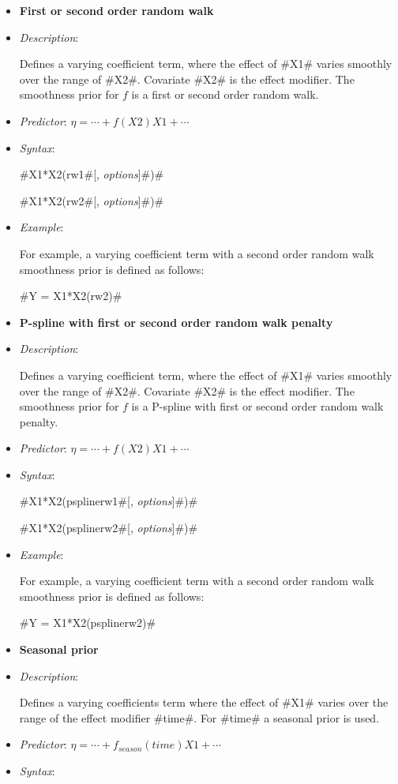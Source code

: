 \begin{itemize}
\item[]{\bf\sffamily First or second order random walk}

\item[] {\em Description}:

Defines a varying coefficient term, where the effect of #X1# varies
smoothly over the range of #X2#. Covariate #X2# is the effect
modifier. The smoothness prior for $f$ is a first or second order
random walk.
\item[] {\em Predictor}: $\eta= \cdots + f(X2)X1 + \cdots$
\item[] {\em Syntax}:

#X1*X2(rw1#[, {\em options}]#)#

#X1*X2(rw2#[, {\em options}]#)#
\item[] {\em Example}:

For example, a varying coefficient term with a second order random
walk smoothness prior is defined as follows:

#Y = X1*X2(rw2)#

\item[]{\bf\sffamily P-spline with first or second order random
walk penalty}

\item[] {\em Description}:

Defines a varying coefficient term, where the effect of #X1# varies
smoothly over the range of #X2#. Covariate #X2# is the effect
modifier. The smoothness prior for $f$ is a P-spline with first or
second order random walk penalty.
\item[] {\em Predictor}: $\eta= \cdots + f(X2)X1 + \cdots$
\item[] {\em Syntax}:

#X1*X2(psplinerw1#[, {\em options}]#)#

#X1*X2(psplinerw2#[, {\em options}]#)#
\item[] {\em Example}:

For example, a varying coefficient term with a second order random
walk smoothness prior is defined as follows:

#Y = X1*X2(psplinerw2)#

\item[]{\bf\sffamily Seasonal prior}

\item[] {\em Description}:

Defines a varying coefficients term where the effect of #X1# varies
over the range of the effect modifier #time#. For #time# a seasonal
prior is used.
\item[] {\em Predictor}: $\eta= \cdots + f_{season}(time)X1 + \cdots $
\item[] {\em Syntax}:


\end{itemize}
